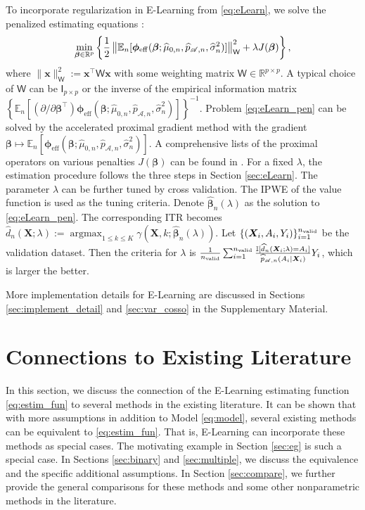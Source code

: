 \documentclass[11pt]{article}
\theoremstyle{definition}
\theoremstyle{remark}
\newcommand{\bx}{\bm{x}}
\newcommand{\bX}{\bm{X}}
\newcommand{\bbeta}{\bm{\beta}}
\newcommand{\bphi}{\bm{\phi}}
\newcommand{\bbE}{\mathbb{E}}
\newcommand{\bbI}{\mathbb{I}}
\newcommand{\bbR}{\mathbb{R}}
\newcommand{\sA}{\mathscr{A}}
\newcommand{\sfI}{\mathsf{I}}
\newcommand{\sfW}{\mathsf{W}}
\newcommand{\argmax}{\mathop{\mathrm{argmax}}}
\newcommand{\bbone}{\bbI}	%
\newcommand{\eff}{\mathrm{eff}}
\begin{document}
To incorporate regularization in E-Learning from \eqref{eq:eLearn}, we solve the penalized estimating equations \citep{johnson2008penalized}:
\begin{align}
	\min_{\bbeta \in \bbR^{p}}\left\{ {1 \over 2}\left\| \bbE_{n}[\bphi_{\eff}(\bbeta;\widehat{\mu}_{0,n},\widehat{p}_{\sA,n},\widehat{\sigma}_{n}^{2})] \right \|^{2}_{\sfW} + \lambda J(\bbeta) \right\},\label{eq:eLearn_pen}
\end{align}
where $ \|\bx\|_{\sfW}^{2} := \bx^{\intercal}\sfW\bx $ with some weighting matrix $ \sfW \in \bbR^{p\times p} $. A typical choice of $ \sfW $ can be $ \sfI_{p \times p} $ or the inverse of the empirical information matrix $ \left\{ \bbE_{n}[(\partial/\partial \bbeta^{\intercal})\bphi_{\eff}(\bbeta;\widehat{\mu}_{0,n},\widehat{p}_{\sA,n},\widehat{\sigma}_{n}^{2})]  \right\}^{-1} $.
Problem \eqref{eq:eLearn_pen} can be solved by the accelerated proximal gradient method \citep{nesterov2013gradient} with the gradient $ \bbeta \mapsto \bbE_{n}[\bphi_{\eff}(\bbeta;\widehat{\mu}_{0,n},\widehat{p}_{\sA,n},\widehat{\sigma}_{n}^{2})] $. A comprehensive lists of the proximal operators on various penalties $ J(\bbeta) $ can be found in \citet{mo2021supervised}.
For a fixed $ \lambda $, the estimation procedure follows the three steps in Section \ref{sec:eLearn}. The parameter $ \lambda $ can be further tuned by cross validation. The IPWE of the value function is used as the tuning criteria. Denote $ \widehat{\bbeta}_{n}(\lambda) $ as the solution to \eqref{eq:eLearn_pen}. The corresponding ITR becomes $ \widehat{d}_{n}(\bX;\lambda) := \argmax_{1 \le k \le K}\gamma(\bX,k;\widehat{\bbeta}_{n}(\lambda)) $. Let $ \{ (\bX_{i},A_{i},Y_{i}) \}_{i=1}^{n_{\rm valid}} $ be the validation dataset. Then the criteria for $ \lambda $ is $ {1 \over n_{\rm valid}}\sum_{i=1}^{n_{\rm valid}}{\bbone[\widehat{d}_{n}(\bX_{i};\lambda) = A_{i}] \over \widehat{p}_{\sA,n}(A_{i}|\bX_{i})}Y_{i} $, which is larger the better.

More implementation details for E-Learning are discussed in Sections \ref{sec:implement_detail} and \ref{sec:var_cosso} in the Supplementary Material. 

\section{Connections to Existing Literature}\label{sec:connect}
In this section, we discuss the connection of the E-Learning estimating function \eqref{eq:estim_fun} to several methods in the existing literature. It can be shown that with more assumptions in addition to Model \eqref{eq:model}, several existing methods can be equivalent to \eqref{eq:estim_fun}. That is, E-Learning can incorporate these methods as special cases. The motivating example in Section \ref{sec:eg} is such a special case. In Sections \ref{sec:binary} and \ref{sec:multiple}, we discuss the equivalence and the specific additional assumptions.  In Section \ref{sec:compare}, we further provide the general comparisons for these methods and some other nonparametric methods in the literature.
\end{document}
